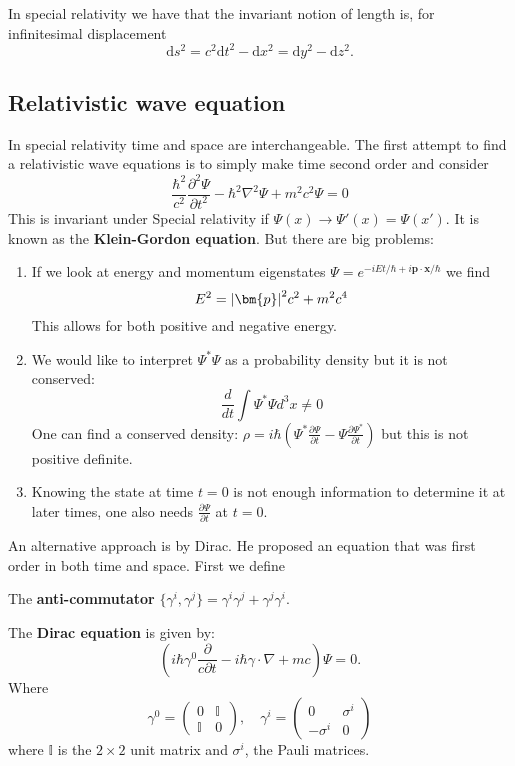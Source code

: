 \documentclass[12pt, a4paper]{article}
\begin{document}
\begin{mdnote}
    In special relativity we have that the invariant notion of length is, for infinitesimal displacement 
    \[\text{d}s^2 =c^2 \text{d}t^2 -\text{d}x^2=\text{d}y^2-\text{d}z^2.\]
\end{mdnote}

\subsection{Relativistic wave equation}

In special relativity time and space are interchangeable. 
The first attempt to find a relativistic wave equations is to simply make time second order and consider
\[
\frac{\hbar^2}{c^2} \frac{\partial^2 \Psi}{\partial t^2} - \hbar^2 \nabla^2 \Psi + m^2 c^2 \Psi = 0
\]
This is invariant under Special relativity if \( \Psi(x) \rightarrow \Psi'(x) = \Psi(x') \). It is known as the \textbf{Klein-Gordon equation}. But there are big problems:

\begin{enumerate}
    \item If we look at energy and momentum eigenstates \( \Psi = e^{-iEt/\hbar + i\bm{p} \cdot \bm{x}/\hbar} \) we find
    \[
    E^2 = \abs{\bm{p}}^2 c^2 + m^2 c^4
    \]
    This allows for both positive and negative energy.

    \item We would like to interpret \( \Psi^* \Psi \) as a probability density but it is not conserved:
    \[
    \frac{d}{dt} \int \Psi^* \Psi d^3x \neq 0
    \]
    One can find a conserved density: \( \rho = i\hbar(\Psi^* \frac{\partial \Psi}{\partial t} - \Psi \frac{\partial \Psi^*}{\partial t}) \) but this is not positive definite.
    \item Knowing the state at time \( t = 0 \) is not enough information to determine it at later times, one also needs \( \frac{\partial \Psi}{\partial t} \) at \( t = 0 \).
\end{enumerate}

An alternative approach is by Dirac. He proposed an equation that was first order in both time and space. First we define 

\begin{definition}
    The \textbf{anti-commutator} \(\{\gamma^i,\gamma^j\}=\gamma^i\gamma^j +\gamma^j\gamma^i\).
\end{definition}

\begin{definition}
    The \textbf{Dirac equation} is given by:
    \[\left( i\hbar \gamma^0 \frac{\partial}{c \partial t} - i\hbar \gamma \cdot \nabla + mc \right) \Psi = 0.\]
    Where
    \[
    \gamma^0 = \begin{pmatrix} 0 & \mathbb{I} \\ \mathbb{I} & 0 \end{pmatrix}, \quad
    \gamma^i = \begin{pmatrix} 0 & \sigma^i \\ -\sigma^i & 0 \end{pmatrix}
    \]
    where \(\mathbb{I}\) is the \(2 \times 2\) unit matrix and \(\sigma^i\), the Pauli matrices. 
\end{definition}
\end{document}
